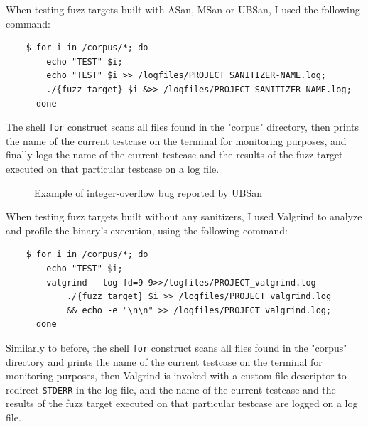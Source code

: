 \newpage
When testing fuzz targets built with ASan, MSan or UBSan, I used the following command:
\begin{verbatim}
    $ for i in /corpus/*; do 
        echo "TEST" $i; 
        echo "TEST" $i >> /logfiles/PROJECT_SANITIZER-NAME.log; 
        ./{fuzz_target} $i &>> /logfiles/PROJECT_SANITIZER-NAME.log; 
      done
\end{verbatim}
The shell \verb|for| construct scans all files found in the "corpus" directory, then prints the name of the current testcase on the terminal for monitoring purposes, and finally logs the name of the current testcase and the results of the fuzz target executed on that particular testcase on a log file.

\begin{figure}[h]
\caption{Example of integer-overflow bug reported by UBSan}
\label{fig:ubsan_example}
\end{figure}


\newpage
When testing fuzz targets built without any sanitizers, I used Valgrind to analyze and profile the binary's execution, using the following command:
\begin{verbatim}
    $ for i in /corpus/*; do 
        echo "TEST" $i; 
        valgrind --log-fd=9 9>>/logfiles/PROJECT_valgrind.log 
            ./{fuzz_target} $i >> /logfiles/PROJECT_valgrind.log 
            && echo -e "\n\n" >> /logfiles/PROJECT_valgrind.log; 
      done
\end{verbatim}
Similarly to before, the shell \verb|for| construct scans all files found in the "corpus" directory and prints the name of the current testcase on the terminal for monitoring purposes, then Valgrind is invoked with a custom file descriptor to redirect \verb|STDERR| in the log file, and the name of the current testcase and the results of the fuzz target executed on that particular testcase are logged on a log file.

